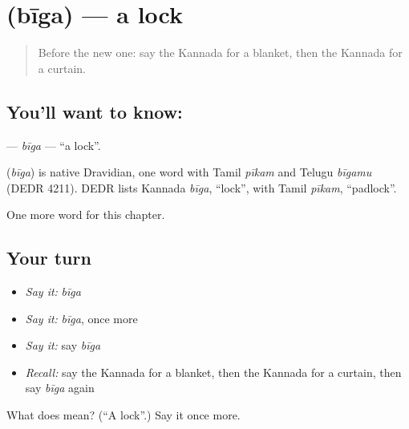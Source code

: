 \section[\texorpdfstring{\kn{ಬೀಗ} (bīga)}{ಬೀಗ (bīga)}]{ (bīga) — a lock}

\label{lesson:KA-C116-biga}



\begin{quote}
Before the new one: say the Kannada for a blanket, then the Kannada for a curtain.
\end{quote}

\subsection*{You'll want to know: }
\textbf{} — \emph{bīga} — \textquotedblleft{}a lock\textquotedblright{}.

\begin{cousinweb}
\textbf{} (\emph{bīga}) is native Dravidian, one word with Tamil \emph{pīkam} and Telugu \emph{bīgamu} (DEDR 4211). DEDR lists Kannada \emph{bīga}, \textquotedblleft{}lock\textquotedblright{}, with Tamil \emph{pīkam}, \textquotedblleft{}padlock\textquotedblright{}.
\end{cousinweb}

\begin{grammarlens}[title={What you've built}]
One more word for this chapter.
\end{grammarlens}

\subsection*{Your turn}
\begin{itemize}
\raggedright
  \item \emph{Say it:} \emph{bīga}
  \item \emph{Say it:} \emph{bīga}, once more
  \item \emph{Say it:} say \emph{bīga}
  \item \emph{Recall:} say the Kannada for a blanket, then the Kannada for a curtain, then say \emph{bīga} again
\end{itemize}

\begin{tcolorbox}[breakable,colback=teal!4,colframe=teal!35!black,title={Before you move on}]
What does  mean? (\textquotedblleft{}A lock\textquotedblright{}.) Say it once more.
\end{tcolorbox}
